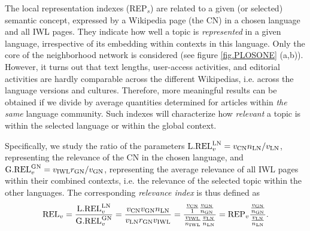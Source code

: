 \documentclass[a4paper,10pt]{scrbook}
\begin{document}
The local representation indexes (REP$_s$) are related to a given (or selected) 
semantic concept, expressed by a Wikipedia page (the CN) in a chosen language 
and all IWL pages. They indicate how well a topic is \textit{represented} in a 
given language, irrespective of its embedding within contexts in this language. 
Only the core of the neighborhood network is considered (see figure \ref{fig.PLOSONE} (a,b)). However, it turns 
out that text lengths, user-access activities, and editorial activities are 
hardly comparable across the different Wikipedias, i.e. across the language 
versions and cultures. Therefore, more meaningful results can be obtained if we 
divide by average quantities determined for articles within \textit{the same} 
language community. Such indexes will characterize how \textit{relevant} a 
topic is within the selected language or within the global context. 

Specifically, we study the ratio of the parameters ${\rm L.REL}_v^{\rm LN} =
v_{\rm CN} n_{\rm LN} / v_{\rm LN}$, representing the relevance of the CN in the
chosen language, and ${\rm G.REL}_v^{\rm GN} = v_{\rm IWL} r_{\rm GN} / v_{\rm
GN}$, representing the average relevance
of all IWL pages within their combined contexts, i.e. the relevance of the
selected topic within the other languages.
The corresponding \textit{relevance index} is thus defined as
\begin{equation}
{\rm REL}_v = \frac{{\rm L.REL}_v^{\rm LN}}{{\rm G.REL}_v^{\rm GN}} = {v_{\rm CN} 
v_{\rm GN} n_{\rm LN} \over v_{\rm LN} r_{\rm GN} v_{\rm IWL}}
= {{v_{\rm CN} \over 1} {v_{\rm GN} \over n_{\rm GN}} \over {v_{\rm IWL} \over 
n_{\rm IWL}} {v_{\rm LN} \over n_{\rm LN}}} = {\rm REP}_v
{{v_{\rm GN} \over n_{\rm GN}} \over {v_{\rm LN} \over n_{\rm LN}}}.
\label{EQ.RELv}
\end{equation}
\end{document}

